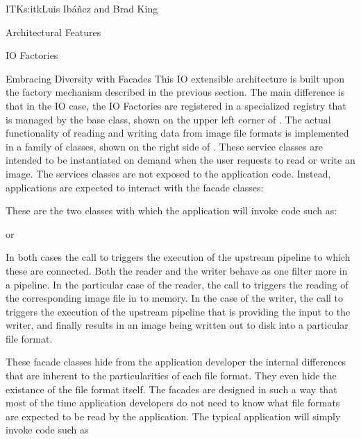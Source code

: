 \begin{aosachapter}{ITK}{s:itk}{Luis Ib\'{a}\~{n}ez and Brad King}
\begin{aosasect1}{Architectural Features}
\begin{aosasect2}{IO Factories}
\begin{aosasect3}{Embracing Diversity with Facades}
This  IO extensible architecture is built upon the factory mechanism
described in the previous section. The main difference is that in the IO case,
the IO Factories are registered in a specialized registry that is managed by
the  base class, shown on the upper left corner of
. The actual functionality of reading
and writing data from image file formats is implemented in a family of
 classes, shown on the right side of
. These service classes are intended
to be instantiated on demand when the user requests to read or write an image.
The services classes are not exposed to the application code. Instead,
applications are expected to interact with the facade classes:

\begin{aosaitemize}
\item {}
\item {}
\end{aosaitemize}

\noindent These are the two classes with which the application will invoke code such as:

\begin{aosaitemize}
\item {}
\item {}
\end{aosaitemize}

\noindent or

\begin{aosaitemize}
\item {}
\item {}
\end{aosaitemize}

In both cases the call to  triggers the execution of the
upstream pipeline to which these  are connected. Both the
reader and the writer behave as one filter more in a pipeline. In the
particular case of the reader, the call to  triggers the reading
of the corresponding image file in to memory. In the case of the writer, the
call to  triggers the execution of the upstream pipeline that is
providing the input to the writer, and finally results in an image being
written out to disk into a particular file format.

These facade classes hide from the application developer the
internal differences that are inherent to the particularities of
each file format. They even hide the existance of the file format
itself. The facades are designed in such a way that most of the
time application developers do not need to know what file formats
are expected to be read by the application. The typical
application will simply invoke code such as


\end{aosasect3}
\end{aosasect2}
\end{aosasect1}
\end{aosachapter}
